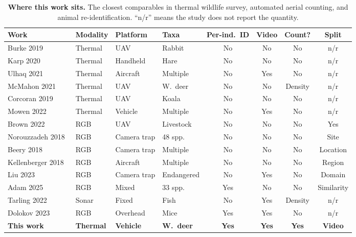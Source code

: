\begin{table}[htbp]
\caption{\textbf{Where this work sits.} The closest comparables in thermal wildlife
survey, automated aerial counting, and animal re-identification. ``n/r'' means the study does
not report the quantity.\label{tab:related}}
\centering\footnotesize
\setlength{\tabcolsep}{3pt}
\begin{tabularx}{\textwidth}{Llllcccc}
\toprule
\textbf{Work} & \textbf{Modality} & \textbf{Platform} & \textbf{Taxa} &
\textbf{Per-ind.\ ID} & \textbf{Video} & \textbf{Count?} & \textbf{Split} \\
\midrule
Burke 2019~\cite{burke2019optimizing} & Thermal & UAV & Rabbit & No & No & No & n/r \\
Karp 2020~\cite{karp2020detecting} & Thermal & Handheld & Hare & No & No & No & n/r \\
Ulhaq 2021~\cite{ulhaq2021automated} & Thermal & Aircraft & Multiple & No & Yes & No & n/r \\
McMahon 2021~\cite{mcmahon2021comparing} & Thermal & UAV & W.\ deer & No & No & Density & n/r \\
Corcoran 2019~\cite{corcoran2019automated} & Thermal & UAV & Koala & No & No & No & n/r \\
Mowen 2022~\cite{mowen2022improving} & Thermal & Vehicle & Multiple & No & Yes & No & n/r \\
Brown 2022~\cite{brown2022automated} & RGB & UAV & Livestock & No & No & No & Yes \\
Norouzzadeh 2018~\cite{norouzzadeh2018automatically} & RGB & Camera trap & 48 spp. & No & No & No & Site \\
Beery 2018~\cite{beery2018recognition} & RGB & Camera trap & Multiple & No & No & No & Location \\
Kellenberger 2018~\cite{kellenberger2018detecting} & RGB & Aircraft & Multiple & No & No & No & Region \\
Liu 2023~\cite{liu2023lote} & RGB & Camera trap & Endangered & No & Yes & No & Domain \\
Adam 2025~\cite{adam2025wildlifereid10k} & RGB & Mixed & 33 spp. & Yes & No & No & Similarity \\
Tarling 2022~\cite{tarling2022deep} & Sonar & Fixed & Fish & No & Yes & Density & n/r \\
Dolokov 2023~\cite{dolokov2023upper} & RGB & Overhead & Mice & Yes & Yes & No & n/r \\
\midrule
\textbf{This work} & \textbf{Thermal} & \textbf{Vehicle} & \textbf{W.\ deer} &
\textbf{Yes} & \textbf{Yes} & \textbf{Yes} & \textbf{Video} \\
\bottomrule
\end{tabularx}
\end{table}

